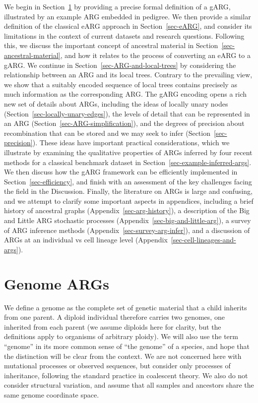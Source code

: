 \documentclass{article}
\begin{document}
We begin in Section~\ref{sec-gARG} by providing a precise formal definition
of a gARG, illustrated by an example ARG embedded in pedigree.
We then provide a similar definition of the classical eARG
approach in Section~\ref{sec-eARG}, and consider its limitations
in the context of current datasets and research questions.
Following this, we discuss the important concept of ancestral material
in Section~\ref{sec-ancestral-material}, and how it relates
to the process of converting an eARG to a gARG.
We continue
in Section~\ref{sec-ARG-and-local-trees} by considering the relationship
between an ARG and its local trees. Contrary to the
prevailing view, we show that a suitably encoded sequence of local trees contains
precisely as much information as the corresponding ARG.
The gARG encoding opens a rich new set of details about ARGs,
including the ideas of locally unary nodes
(Section~\ref{sec-locally-unary-edges}),
the levels of detail that can be represented in an ARG
(Section~\ref{sec-ARG-simplification}),
and the degrees of precision about recombination
that can be stored and we may seek to infer (Section~\ref{sec-precision}).
These ideas have important practical considerations,
which we illustrate by examining the qualitative properties of
ARGs inferred by four recent methods for a classical benchmark
dataset in Section~\ref{sec-example-inferred-args}.
We then discuss how the gARG framework can be
efficiently implemented in Section~\ref{sec-efficiency},
and finish with an assessment of the key challenges facing
the field in the Discussion.
Finally, the literature on ARGs is large and
confusing, and we attempt to clarify some important aspects
in appendices, including
a brief history of ancestral graphs (Appendix~\ref{sec-arg-history}),
a description of the Big and Little ARG stochastic processes
 (Appendix~\ref{sec-big-and-little-arg}),
a survey of ARG inference methods (Appendix~\ref{sec-survey-arg-infer}),
and a discussion of ARGs at an individual vs cell
lineage level (Appendix~\ref{sec-cell-lineages-and-args}).

\section{Genome ARGs}
\label{sec-gARG}
We define a genome as the complete set of genetic material that a child
inherits from one parent. A diploid individual
therefore carries two genomes, one inherited from each parent (we assume diploids here
for clarity, but the definitions apply to organisms of arbitrary ploidy).
We will also use the term ``genome'' in its
more common sense of ``the genome'' of a species,
and hope that the distinction will be clear from the context.
We are not concerned here with mutational processes or observed sequences,
but consider only processes of inheritance,
following the standard practice in coalescent theory.
We also do not consider structural variation, and assume that all
samples and ancestors share the same genome coordinate space.
\end{document}
